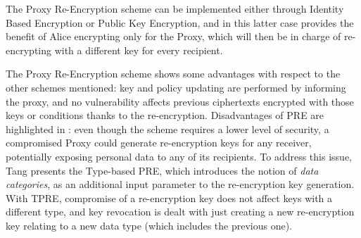 The Proxy Re-Encryption scheme can be implemented either through Identity Based Encryption or Public Key Encryption, and in this latter case provides the benefit of Alice encrypting only for the Proxy, which will then be in charge of re-encrypting with a different key for every recipient.

The Proxy Re-Encryption scheme shows some advantages with respect to the other schemes mentioned: key and policy updating are performed by informing the proxy, and no vulnerability affects previous ciphertexts encrypted with those keys or conditions thanks to the re-encryption. Disadvantages of PRE are highlighted in \cite{tang2008using}: even though the scheme requires a lower level of security, a compromised Proxy could generate re-encryption keys for any receiver, potentially exposing personal data to any of its recipients. To address this issue, Tang presents the Type-based PRE, which introduces the notion of \textit{data categories}, as an additional input parameter to the re-encryption key generation. With TPRE, compromise of a re-encryption key does not affect keys with a different type, and key revocation is dealt with just creating a new re-encryption key relating to a new data type (which includes the previous one).